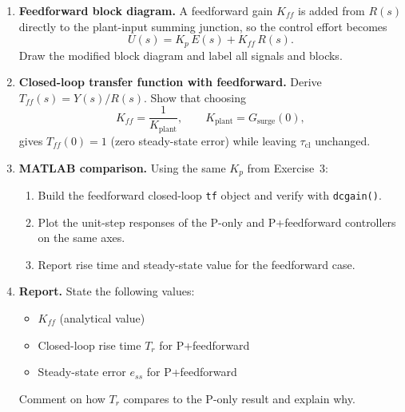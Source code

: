 \documentclass[11pt]{article}
\begin{document}
\begin{enumerate}

\item \textbf{Feedforward block diagram.}
  A feedforward gain $K_{ff}$ is added from $R(s)$ directly to the plant-input
  summing junction, so the control effort becomes
  \[
    U(s) = K_p\,E(s) + K_{ff}\,R(s).
  \]
  Draw the modified block diagram and label all signals and blocks.

\item \textbf{Closed-loop transfer function with feedforward.}
  Derive $T_{ff}(s) = Y(s)/R(s)$.  Show that choosing
  \[
    K_{ff} = \frac{1}{K_{\mathrm{plant}}}, \qquad K_{\mathrm{plant}} = G_{\mathrm{surge}}(0),
  \]
  gives $T_{ff}(0) = 1$ (zero steady-state error) while leaving
  $\tau_{\mathrm{cl}}$ unchanged.

\item \textbf{MATLAB comparison.}
  Using the same $K_p$ from Exercise~3:
  \begin{enumerate}
    \item Build the feedforward closed-loop \texttt{tf} object and verify with
          \texttt{dcgain()}.
    \item Plot the unit-step responses of the P-only and P+feedforward
          controllers on the same axes.
    \item Report rise time and steady-state value for the feedforward case.
  \end{enumerate}

\item \textbf{Report.}
  State the following values:
  \begin{itemize}
    \item $K_{ff}$ (analytical value)
    \item Closed-loop rise time $T_r$ for P+feedforward
    \item Steady-state error $e_{ss}$ for P+feedforward
  \end{itemize}
  Comment on how $T_r$ compares to the P-only result and explain why.

\end{enumerate}
\end{document}
